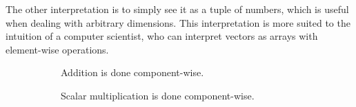  The other interpretation is to simply see it as a tuple of numbers, which is useful when dealing with arbitrary dimensions. This interpretation is more suited to the intuition of a computer scientist, who can interpret vectors as arrays with element-wise operations. 

  \begin{figure}[H]
    \centering
    \begin{subfigure}[b]{0.48\textwidth}
      \centering
      \caption{Addition is done component-wise.}
      \label{fig:tuple-addition}
    \end{subfigure}
    \hfill 
    \begin{subfigure}[b]{0.48\textwidth}
      \centering
      \caption{Scalar multiplication is done component-wise.}
      \label{fig:tuple-scalar}
    \end{subfigure}
    \caption{}
  \end{figure}

